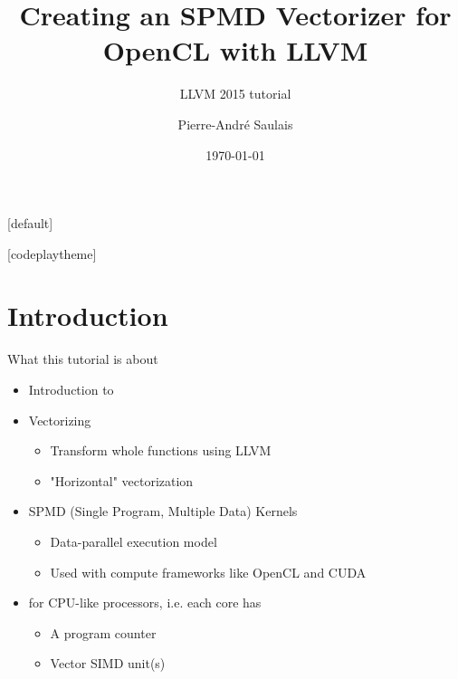 \documentclass[t,aspectratio=169]{beamer}
\title{Creating an SPMD Vectorizer for OpenCL with LLVM}
\subtitle{LLVM 2015 tutorial}
\author{Pierre-André Saulais}
\institute{Codeplay Software \\ @codeplaysoft}
\date{\today}
\begin{document}
[default]

\begin{frame}
  \vspace{4ex}
  \titlepage
\end{frame}


[codeplaytheme]

\section*{Introduction}

\begin{frame}{What this tutorial is about}

\begin{itemize}
    \item Introduction to
    \item Vectorizing
    \begin{itemize}
        \item Transform whole functions using LLVM
        \item "Horizontal" vectorization
    \end{itemize}  
    \item SPMD (Single Program, Multiple Data) Kernels
    \begin{itemize}
        \item Data-parallel execution model
        \item Used with compute frameworks like OpenCL and CUDA
    \end{itemize}
    \item for CPU-like processors, i.e. each core has
    \begin{itemize}
        \item A program counter
        \item Vector SIMD unit(s)
    \end{itemize}
\end{itemize}

\end{frame}

\end{document}
